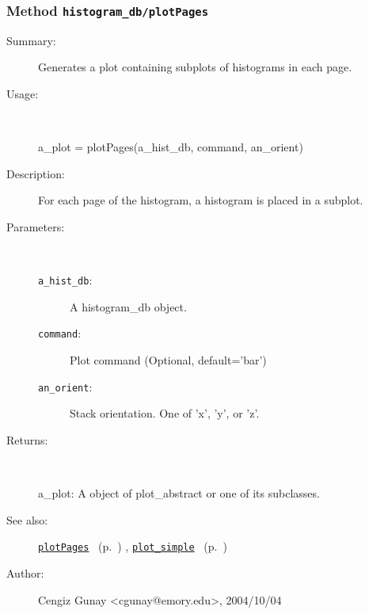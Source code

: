 \subsubsection[Method \texttt{plotPages}]{Method \texttt{histogram\_db/plotPages}}%
%
\label{ref_histogram_db__plotPages}%
\hypertarget{ref_histogram_db__plotPages}{}%
\begin{description}
\item[Summary:]Generates a plot containing subplots of histograms in each page.
%
\item[Usage:]~%
\begin{lyxcode}%
a\_plot = plotPages(a\_hist\_db, command, an\_orient)
%
\end{lyxcode}%
%
\item[Description:]%
For each page of the histogram, a histogram is placed in a subplot.
\item[Parameters:]~
\begin{description}%
\item[\texttt{a\_hist\_db}:]
 A histogram\_db object.
\item[\texttt{command}:]
 Plot command (Optional, default='bar')
\item[\texttt{an\_orient}:]
 Stack orientation. One of 'x', 'y', or 'z'.
\end{description}%
%
\item[Returns:]~

	a\_plot: A object of plot\_abstract or one of its subclasses.
%
%
\item[See also:]%
\hyperlink{ref_plotPages}{\texttt{plotPages}}%
\ (p.~\pageref{ref_plotPages})%
%
, \hyperlink{ref_plot_simple}{\texttt{plot\_simple}}%
\ (p.~\pageref{ref_plot_simple})%
%
%
\item[Author:]%
Cengiz Gunay <cgunay@emory.edu>, 2004/10/04%
\end{description}
\methodline%
